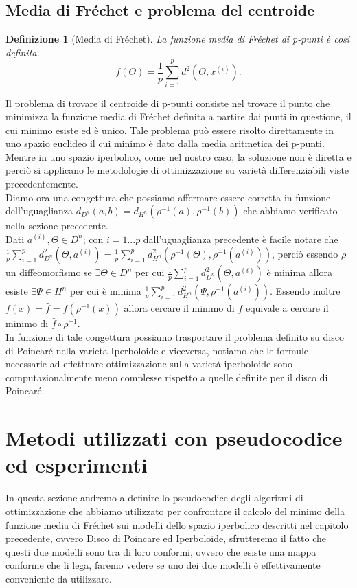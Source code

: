 \documentclass[a4paper, 12pt]{article}
\newtheorem{definition}{Definizione}
\begin{document}
\subsection{Media di Fréchet e problema del centroide}
\begin{definition}[Media di Fréchet]
La funzione media di Fréchet di p-punti è cosi definita.\\
\[f(\Theta) = \frac{1}{p}\sum_{i=1}^p d^2(\Theta, x^{(i)}).\]
\end{definition}
Il problema di trovare il centroide di p-punti consiste nel trovare il punto che minimizza la funzione media di Fréchet definita a partire dai punti in questione, il cui minimo esiste ed è unico. Tale problema può essere risolto direttamente in uno spazio euclideo il cui minimo è dato dalla media aritmetica dei p-punti. Mentre in uno spazio iperbolico, come nel nostro caso, la soluzione non è diretta e perciò si applicano le metodologie di ottimizzazione su varietà differenziabili viste precedentemente.\\
Diamo ora una congettura che possiamo affermare essere corretta in funzione dell'uguaglianza $d_{D^n}(a, b) = d_{H^n}(\rho^{-1}(a), \rho^{-1}(b))$ che abbiamo verificato nella sezione precedente.\\
Dati $a^{(i)}, \Theta \in D^n$; con $i = 1...p$ dall'uguaglianza precedente è facile notare che $\frac{1}{p}\sum_{i=1}^p d_{D^n}^2(\Theta, a^{(i)}) = \frac{1}{p}\sum_{i=1}^p d_{H^n}^2(\rho^{-1}(\Theta), \rho^{-1}(a^{(i)}))$, perciò essendo $\rho$ un diffeomorfismo se $\exists \Theta \in D^n$ per cui $\frac{1}{p}\sum_{i=1}^p d_{D^n}^2(\Theta, a^{(i)})$ è minima allora esiste $\exists \Psi \in H^n$ per cui è minima $\frac{1}{p}\sum_{i=1}^p d_{H^n}^2(\Psi, \rho^{-1}(a^{(i)}))$. Essendo inoltre $f(x) = \hat{f} = f(\rho^{-1}(x))$ allora cercare il minimo di $f$ equivale a cercare il minimo di $\hat{f} \circ \rho^{-1}$.\\
In funzione di tale congettura possiamo trasportare il problema definito su disco di Poincaré nella varieta Iperboloide e viceversa, notiamo che le formule necessarie ad effettuare ottimizzazione sulla varietà iperboloide sono computazionalmente meno complesse rispetto a quelle definite per il disco di Poincaré.
\section{Metodi utilizzati con pseudocodice ed esperimenti}
In questa sezione andremo a definire lo pseudocodice degli algoritmi di ottimizzazione che abbiamo utilizzato per confrontare il calcolo del minimo della funzione media di Fréchet sui modelli dello spazio iperbolico descritti nel capitolo precedente, ovvero Disco di Poincare ed Iperboloide, sfrutteremo il fatto che questi due modelli sono tra di loro conformi, ovvero che esiste una mappa conforme che li lega, faremo vedere se uno dei due modelli è effettivamente conveniente da utilizzare.
\end{document}
